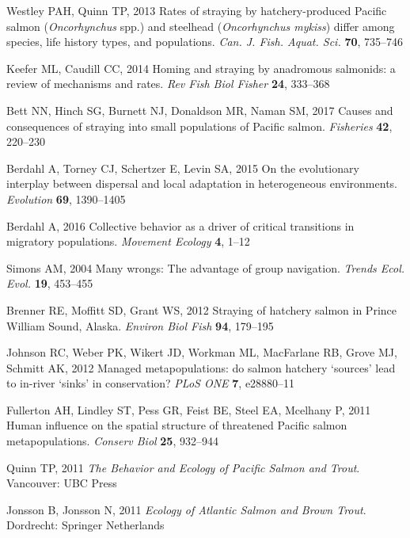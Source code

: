 \documentclass{revtex4}
\begin{document}
\begin{thebibliography}{10}
Westley PAH, Quinn TP, 2013 {Rates of straying by hatchery-produced Pacific
  salmon (\emph{Oncorhynchus} spp.) and steelhead (\emph{Oncorhynchus mykiss})
  differ among species, life history types, and populations}.
\newblock \emph{Can. J. Fish. Aquat. Sci.} \textbf{70}, 735--746

Keefer ML, Caudill CC, 2014 {Homing and straying by anadromous salmonids: a
  review of mechanisms and rates}.
\newblock \emph{Rev Fish Biol Fisher} \textbf{24}, 333--368

Bett NN, Hinch SG, Burnett NJ, Donaldson MR, Naman SM, 2017 {Causes and
  consequences of straying into small populations of Pacific salmon}.
\newblock \emph{Fisheries} \textbf{42}, 220--230

Berdahl A, Torney CJ, Schertzer E, Levin SA, 2015 {On the evolutionary
  interplay between dispersal and local adaptation in heterogeneous
  environments}.
\newblock \emph{Evolution} \textbf{69}, 1390--1405

Berdahl A, 2016 {Collective behavior as a driver of critical transitions in
  migratory populations}.
\newblock \emph{Movement Ecology} \textbf{4}, 1--12

Simons AM, 2004 {Many wrongs: The advantage of group navigation}.
\newblock \emph{Trends Ecol. Evol.} \textbf{19}, 453--455

Brenner RE, Moffitt SD, Grant WS, 2012 {Straying of hatchery salmon in Prince
  William Sound, Alaska}.
\newblock \emph{Environ Biol Fish} \textbf{94}, 179--195

Johnson RC, Weber PK, Wikert JD, Workman ML, MacFarlane RB, Grove MJ, Schmitt
  AK, 2012 {Managed metapopulations: do salmon hatchery
  {\textquoteleft}sources{\textquoteright} lead to in-river
  {\textquoteleft}sinks{\textquoteright} in conservation?}
\newblock \emph{PLoS ONE} \textbf{7}, e28880--11

Fullerton AH, Lindley ST, Pess GR, Feist BE, Steel EA, Mcelhany P, 2011 {Human
  influence on the spatial structure of threatened Pacific salmon
  metapopulations}.
\newblock \emph{Conserv Biol} \textbf{25}, 932--944

Quinn TP, 2011 \emph{{The Behavior and Ecology of Pacific Salmon and Trout}}.
\newblock Vancouver: UBC Press

Jonsson B, Jonsson N, 2011 \emph{{Ecology of Atlantic Salmon and Brown Trout}}.
\newblock Dordrecht: Springer Netherlands


\end{thebibliography}
\end{document}
